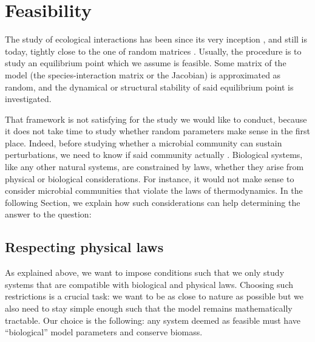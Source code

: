 \documentclass[12pt, titlepage]{report}
\begin{document}
\section{Feasibility}
The study of ecological interactions has been since its very inception \cite{may_will_1972}, and still is today, tightly close to the one of random matrices \cite{allesina_stability_2012, allesina_predicting_2015, barbier_cavity_2017}. Usually, the procedure is to study an equilibrium point which we assume is feasible. Some matrix of the model (\eg the species-interaction matrix or the Jacobian) is approximated as random, and the dynamical or structural stability of said equilibrium point is investigated.

That framework is not satisfying for the study we would like to conduct, because it does not take time to study whether random parameters make sense in the first place.
Indeed, before studying whether a microbial community can sustain perturbations, we need to know if said community actually . Biological systems, like any other natural systems, are constrained by laws, whether they arise from physical or biological considerations. For instance, it would not make sense to consider microbial communities that \eg violate the laws of thermodynamics. In the following Section, we explain how such considerations can help determining the answer to the  question:

\begin{centering}
\end{centering}
\subsection{Respecting physical laws}\label{sec : methods feasibility basic concepts}
As explained above, we want to impose conditions such that we only study systems that are compatible with biological and physical laws. Choosing such restrictions is a crucial task: we want to be as close to nature as possible but we also need to stay simple enough such that the model remains mathematically tractable. Our %
choice is the following:
  any system deemed as feasible must have ``biological'' model parameters and conserve biomass.
\end{document}
